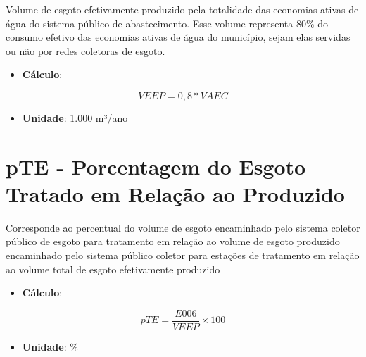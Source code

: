 \documentclass[]{book}
\providecommand{\tightlist}{%
  \setlength{\itemsep}{0pt}\setlength{\parskip}{0pt}}
\begin{document}
Volume de esgoto efetivamente produzido pela totalidade das economias ativas de água do sistema público de abastecimento. Esse volume representa 80\% do consumo efetivo das economias ativas de água do município, sejam elas servidas ou não por redes coletoras de esgoto.

\begin{itemize}
\tightlist
\item
  \textbf{Cálculo}:
\end{itemize}

\[
VEEP = 0,8 * VAEC
\]

\begin{itemize}
\tightlist
\item
  \textbf{Unidade}: 1.000 m³/ano
\end{itemize}

\hypertarget{pte---porcentagem-do-esgoto-tratado-em-relauxe7uxe3o-ao-produzido}{%
\section*{pTE - Porcentagem do Esgoto Tratado em Relação ao Produzido}\label{pte---porcentagem-do-esgoto-tratado-em-relauxe7uxe3o-ao-produzido}}

Corresponde ao percentual do volume de esgoto encaminhado pelo sistema coletor público de esgoto para tratamento em relação ao volume de esgoto produzido encaminhado pelo sistema público coletor para estações de tratamento em relação ao volume total de esgoto efetivamente produzido

\begin{itemize}
\tightlist
\item
  \textbf{Cálculo}:
\end{itemize}

\[
pTE = \frac{E006}{VEEP} \times 100
\]

\begin{itemize}
\tightlist
\item
  \textbf{Unidade}: \%
\end{itemize}
\end{document}
